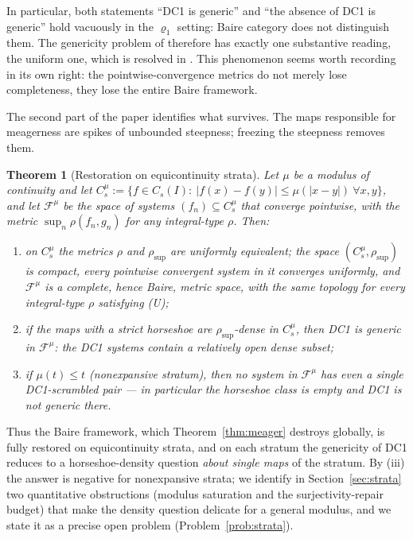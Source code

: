 ﻿\documentclass[11pt]{article}
\newtheorem{theorem}{Theorem}[section]
\newcommand{\I}{I}
\newcommand{\Cs}{C_s(\I)}
\newcommand{\rsup}{\rho_{\sup}}
\begin{document}
In particular, both statements ``DC1 is generic'' and ``the absence of DC1 is
generic'' hold vacuously in the $\varrho_1$ setting: Baire category does not
distinguish them.  The genericity problem of \cite{BR} therefore has exactly one
substantive reading, the uniform one, which is resolved in \cite{companion}.  This
phenomenon seems worth recording in its own right: the pointwise-convergence
metrics do not merely lose completeness, they lose the entire Baire framework.

The second part of the paper identifies what survives.  The maps responsible for
meagerness are spikes of unbounded steepness; freezing the steepness removes them.

\begin{theorem}[Restoration on equicontinuity strata]\label{thm:strata}
Let $\mu$ be a modulus of continuity and let
$C^\mu_s:=\{f\in\Cs:\ |f(x)-f(y)|\le\mu(|x-y|)\ \forall x,y\}$, and let
$\mathcal F^\mu$ be the space of systems $(f_n)\subseteq C^\mu_s$ that converge
pointwise, with the metric $\sup_n\rho(f_n,g_n)$ for any integral-type $\rho$.
Then:
\begin{enumerate}
\item[(i)] on $C^\mu_s$ the metrics $\rho$ and $\rsup$ are uniformly equivalent;
the space $(C^\mu_s,\rsup)$ is compact, every pointwise convergent system in it
converges uniformly, and $\mathcal F^\mu$ is a complete, hence Baire, metric
space, with the same topology for every integral-type $\rho$ satisfying (U);
\item[(ii)] if the maps with a strict horseshoe are $\rsup$-dense in
$C^\mu_s$, then DC1 is generic in $\mathcal F^\mu$: the DC1 systems contain a
relatively open dense subset;
\item[(iii)] if $\mu(t)\le t$ (nonexpansive stratum), then \emph{no} system in
$\mathcal F^\mu$ has even a single DC1-scrambled pair --- in particular the
horseshoe class is empty and DC1 is \emph{not} generic there.
\end{enumerate}
\end{theorem}

Thus the Baire framework, which Theorem~\ref{thm:meager} destroys globally, is
fully restored on equicontinuity strata, and on each stratum the genericity of
DC1 reduces to a horseshoe-density question \emph{about single maps} of the
stratum.  By (iii) the answer is negative for nonexpansive strata; we identify in
Section~\ref{sec:strata} two quantitative obstructions (modulus saturation and
the surjectivity-repair budget) that make the density question delicate for a
general modulus, and we state it as a precise open problem
(Problem~\ref{prob:strata}).
\end{document}

